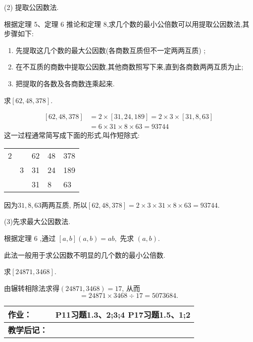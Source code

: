 (2) 提取公因数法.

根据定理 5、定理 6 推论和定理 8,求几个数的最小公倍数可以用提取公因数法,其步骤如下:
\begin{enumerate}
	\item 先提取这几个数的最大公因数(各商数互质但不一定两两互质) ;
	\item 在不互质的商数中提取公因数,其他商数照写下来,直到各商数两两互质为止;
	\item 把提取的各数及各商数连乘起来.
\end{enumerate}

\example 求$[62, 48,378]$.

\solve
\begin{equation*}
	\begin{split}
		[62, 48,378]&=2 \times[31,24,189]=2 \times 3 \times[31,8,63] \\ 
		&=6 \times 31 \times 8 \times 63=93744 
	\end{split}
\end{equation*}
这一过程通常简写成下面的形式,叫作短除式:


\begin{center}
	\begin{table}[htb]
	\begin{tabular}{lllll}
		\multicolumn{1}{l|}{2} &                        & 62 & 48 & 378 \\ \cline{2-5} 
		                       & \multicolumn{1}{l|}{3} & 31 & 24 & 189 \\ \cline{3-5} 
			                   &                        & 31 & 8  & 63 
	\end{tabular}
\end{table}
\end{center}

因为$31,8,63$两两互质, 所以$[62,48,378]=2 \times 3 \times 31 \times 8 \times 63=93744$.

(3)先求最大公因数法.

根据定理 6 ,通过 $[a, b](a, b)=a b,$ 先求 $(a, b)$. 

此法一般用于求公因数不明显的几个数的最小公倍数.

\example 求$[24 871,3468]$.

\solve 由辗转相除法求得$(24871,3468)=17$, 从而
\begin{equation*}
	[24871,3468]=24871\times 3468\div 17=5073684.
\end{equation*}

\begin{table}[htb]
	\centering  
	\begin{tabular}{p{22mm}|p{105.6mm}}
		\hline 
		\textbf{作业：}      & P11习题1.3、2;3;4 \quad P17习题1.5、1;2  \\ \hline
		\textbf{教学后记：}  & \vspace{3ex} \\ \hline
	\end{tabular}
\end{table}